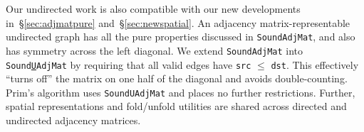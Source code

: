 Our undirected work is also compatible with our new developments
in~\S\ref{sec:adjmatpure} and~\S\ref{sec:newspatial}.
An adjacency matrix-representable undirected graph
has all the pure properties discussed in \texttt{SoundAdjMat},
and also has symmetry across the left diagonal.
We extend \texttt{SoundAdjMat} into
\texttt{Sound{\underline{U}}AdjMat} by requiring that
all valid edges have \texttt{src} $\le$ \texttt{dst}. This effectively ``turns off'' the
matrix on one half of the diagonal and avoids double-counting. Prim's algorithm uses
\texttt{SoundUAdjMat} and places no further restrictions.
Further, spatial representations and fold/unfold utilities are shared
across directed and undirected adjacency matrices.


\lstset{style=myTinyStyle}


